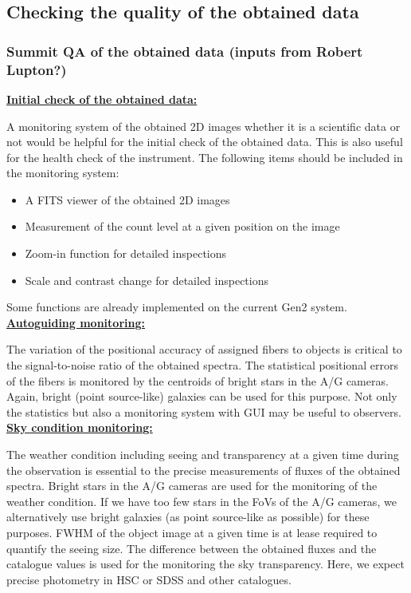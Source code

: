 \documentclass[a4paper]{article}
\begin{document}
\subsection{Checking the quality of the obtained data}
\subsubsection{Summit QA of the obtained data (inputs from Robert Lupton?)}
\noindent \underline{\textbf{Initial check of the obtained data:}}
\vspace{5pt}

A monitoring system of the obtained 2D images whether it is a scientific data or not would be helpful for the initial check of the obtained data. This is also useful for the health check of the instrument. The following items should be included in the monitoring system:\\

\begin{itemize}
\item A FITS viewer of the obtained 2D images
\item Measurement of the count level at a given position on the image
\item Zoom-in function for detailed inspections
\item Scale and contrast change for detailed inspections
\end{itemize}

Some functions are already implemented on the current Gen2 system.\\

\noindent \underline{\textbf{Autoguiding monitoring:}}
\vspace{5pt}

The variation of the positional accuracy of assigned fibers to objects
is critical to the signal-to-noise ratio of the obtained spectra. The
statistical positional errors of the fibers is monitored by the
centroids of bright stars in the A/G cameras. Again, bright (point
source-like) galaxies can be used for this purpose. Not only the
statistics but also a monitoring system with GUI may be useful to
observers.\\

\noindent \underline{\textbf{Sky condition monitoring:}}
\vspace{5pt}

The weather condition including seeing and transparency at a given
time during the observation is essential to the precise measurements
of fluxes of the obtained spectra. Bright stars in the A/G cameras are
used for the monitoring of the weather condition. If we have too few
stars in the FoVs of the A/G cameras, we alternatively use bright
galaxies (as point source-like as possible) for these purposes. FWHM
of the object image at a given time is at lease required to quantify
the seeing size. The difference between the obtained fluxes and the
catalogue values is used for the monitoring the sky
transparency. Here, we expect precise photometry in HSC or SDSS and
other catalogues.
\end{document}
